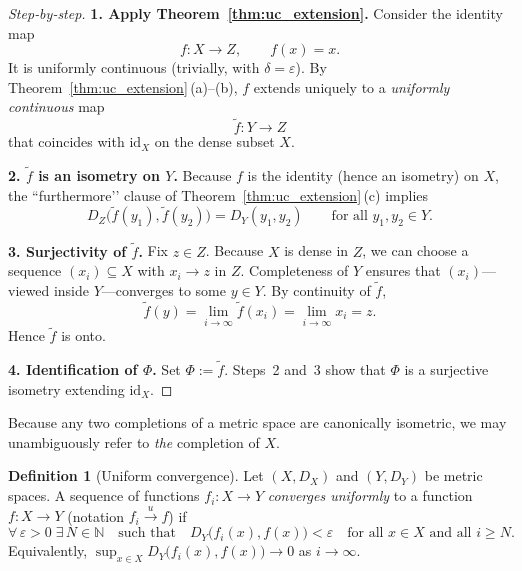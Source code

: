 \documentclass[12pt]{article}
\theoremstyle{definition} %
\newtheorem{definition}{Definition}
\theoremstyle{plain} %
\begin{document}
\begin{proof}[Step‑by‑step]
  \textbf{1.  Apply Theorem \ref{thm:uc_extension}.}  
  Consider the identity map
  \[
      f:X\longrightarrow Z,\qquad f(x)=x .
  \]
  It is uniformly continuous (trivially, with $\delta=\varepsilon$).  
  By Theorem \ref{thm:uc_extension}\,(a)–(b), $f$ extends uniquely to a
  \emph{uniformly continuous} map
  \[
      \widetilde f:Y\longrightarrow Z
  \]
  that coincides with $\mathrm{id}_X$ on the dense subset $X$.

  \medskip
  \textbf{2.  $\widetilde f$ is an isometry on $Y$.}  
  Because $f$ is the identity (hence an isometry) on $X$,
  the “furthermore’’ clause of Theorem \ref{thm:uc_extension}\,(c)
  implies
  \[
      D_Z\bigl(\widetilde f(y_1),\widetilde f(y_2)\bigr)
      =D_Y(y_1,y_2)
      \qquad\text{for all }y_1,y_2\in Y .
  \]

  \medskip
  \textbf{3.  Surjectivity of $\widetilde f$.}  
  Fix $z\in Z$.  
  Because $X$ is dense in $Z$, we can choose a sequence
  $(x_i)\subseteq X$ with $x_i\to z$ in $Z$.
  Completeness of $Y$ ensures that $(x_i)$—viewed inside $Y$—converges
  to some $y\in Y$.
  By continuity of $\widetilde f$,
  \[
      \widetilde f(y)=\lim_{i\to\infty}\widetilde f(x_i)
                    =\lim_{i\to\infty}x_i
                    =z .
  \]
  Hence $\widetilde f$ is onto.

  \medskip
  \textbf{4.  Identification of $\Phi$.}  
  Set $\Phi:=\widetilde f$.  
  Steps 2 and 3 show that $\Phi$ is a surjective isometry
  extending $\mathrm{id}_X$.
\end{proof}

\medskip
\noindent
Because any two completions of a metric space are canonically isometric, we
may unambiguously refer to \emph{the} completion of $X$.

\begin{definition}[Uniform convergence]
  Let $(X,D_X)$ and $(Y,D_Y)$ be metric spaces.
  A sequence of functions $f_i:X\to Y$ \emph{converges uniformly} to a
  function $f:X\to Y$ (notation $f_i\!\xrightarrow{\;u\;} f$) if
  \[
      \forall\,\varepsilon>0\;\exists\,N\in\mathbb N
      \quad\text{such that}\quad
      D_Y\!\bigl(f_i(x),f(x)\bigr)<\varepsilon
      \quad\text{for all }x\in X\text{ and all }i\ge N.
  \]
  Equivalently,
  $\displaystyle\sup_{x\in X}D_Y\!\bigl(f_i(x),f(x)\bigr)\longrightarrow 0$
  as $i\to\infty$.
\end{definition}
\end{document}
